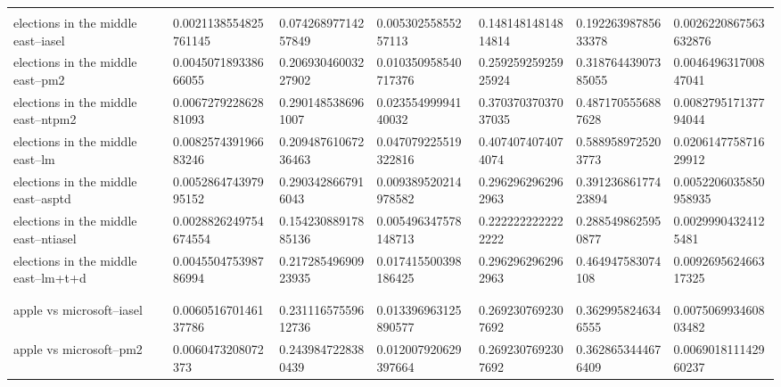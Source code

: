 \begin{table}[h]
\begin{tabular}{lllllll}
                                      &                       &                     &                      &                     &                     &                       \\
elections in the middle east--iasel   & 0.0021138554825761145 & 0.07426897714257849 & 0.00530255855257113  & 0.14814814814814814 & 0.19226398785633378 & 0.0026220867563632876 \\
elections in the middle east--pm2     & 0.004507189338666055  & 0.20693046003227902 & 0.010350958540717376 & 0.25925925925925924 & 0.31876443907385055 & 0.004649631700847041  \\
elections in the middle east--ntpm2   & 0.006727922862881093  & 0.2901485386961007  & 0.02355499994140032  & 0.37037037037037035 & 0.4871705556887628  & 0.008279517137794044  \\
elections in the middle east--lm      & 0.008257439196683246  & 0.20948761067236463 & 0.047079225519322816 & 0.4074074074074074  & 0.5889589725203773  & 0.020614775871629912  \\
elections in the middle east--asptd   & 0.005286474397995152  & 0.2903428667916043  & 0.009389520214978582 & 0.2962962962962963  & 0.39123686177423894 & 0.0052206035850958935 \\
elections in the middle east--ntiasel & 0.0028826249754674554 & 0.15423088917885136 & 0.005496347578148713 & 0.2222222222222222  & 0.2885498625950877  & 0.00299904324125481   \\
elections in the middle east--lm+t+d  & 0.004550475398786994  & 0.21728549690923935 & 0.017415500398186425 & 0.2962962962962963  & 0.464947583074108   & 0.009269562466317325  \\
                                      &                       &                     &                      &                     &                     &                       \\
                                      &                       &                     &                      &                     &                     &                       \\
apple vs microsoft--iasel             & 0.006051670146137786  & 0.23111657559612736 & 0.013396963125890577 & 0.2692307692307692  & 0.3629958246346555  & 0.007506993460803482  \\
apple vs microsoft--pm2               & 0.0060473208072373    & 0.2439847228380439  & 0.012007920629397664 & 0.2692307692307692  & 0.3628653444676409  & 0.006901811142960237  \\

\end{tabular}
\end{table}
